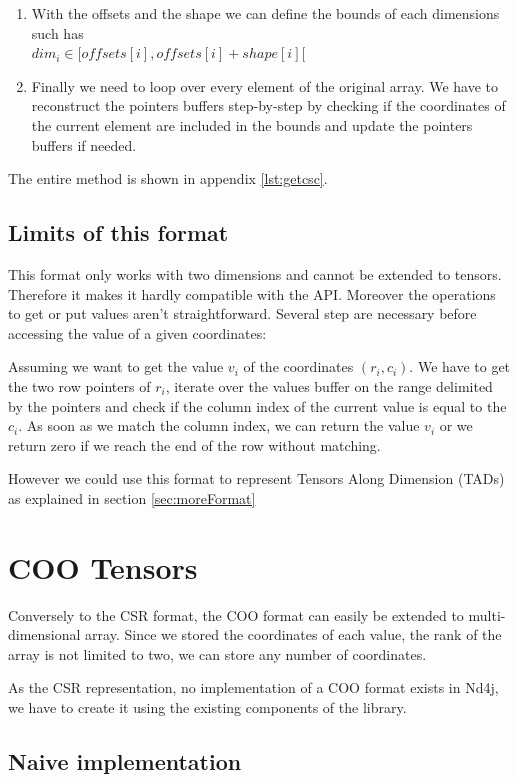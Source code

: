\begin{enumerate}
\item With the offsets and the shape we can define the bounds of each dimensions such has \\
$dim_{i} \in [offsets[i], offsets[i] + shape[i][$
\item Finally we need to loop over every element of the original array. We have to reconstruct the pointers buffers step-by-step by checking if the coordinates of the current element are included in the bounds and update the pointers buffers if needed.
\end{enumerate}

The entire method is shown in appendix \ref{lst:getcsc}.

\subsection{Limits of this format}

This format only works with two dimensions and cannot be extended to tensors. Therefore it makes it hardly compatible with the API.
Moreover the operations to get or put values aren't straightforward. Several step are necessary before accessing the value of a given coordinates:

Assuming we want to get the value $v_{i}$ of the coordinates $(r_{i}, c_{i})$.
 We have to get the two row pointers of $r_{i}$, iterate over the values buffer on the range delimited by the pointers and check if the column index of the current value is equal to the $c_{i}$. As soon as we match the column index, we can return the value $v_{i}$ or we return zero if we reach the end of the row without matching.

However we could use this format to represent Tensors Along Dimension (TADs) as explained in section \ref{sec:moreFormat}

\section{COO Tensors}

Conversely to the CSR format, the COO format can easily be extended to multi-dimensional array. Since we stored the coordinates of each value, the rank of the array is not limited to two, we can store any number of coordinates.
 
As the CSR representation, no implementation of a COO format exists in Nd4j, we have to create it using the existing components of the library.

\subsection{Naive implementation} \label{ssec:naiveCoo}

